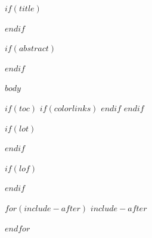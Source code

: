 \documentclass{book}
\begin{document}
  $if(title)$
    \maketitle
  $endif$

  $if(abstract)$
    \begin{abstract}
  $abstract$
    \end{abstract}
  $endif$



  \mainmatter{}

  $body$

  \backmatter{}

  $if(toc)$
  {
  $if(colorlinks)$
    \hypersetup{linkcolor=$if(toccolor)$$toccolor$$else$black$endif$}
  $endif$
    \setcounter{tocdepth}{$toc-depth$}
    \tableofcontents
  }
  $endif$

  $if(lot)$
    \listoftables
  $endif$

  $if(lof)$
    \listoffigures
  $endif$


  $for(include-after)$
  $include-after$

  $endfor$
\end{document}
